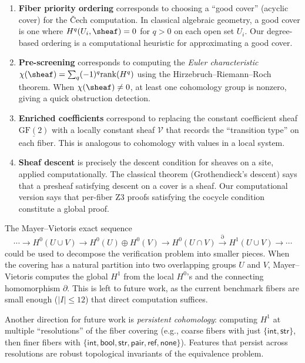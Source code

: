 \begin{enumerate}
  \item \textbf{Fiber priority ordering} corresponds to choosing a
    ``good cover'' (acyclic cover) for the \v{C}ech computation.
    In classical algebraic geometry, a good cover is one where
    $H^q(U_i, \sheaf) = 0$ for $q > 0$ on each open set $U_i$.
    Our degree-based ordering is a computational heuristic for
    approximating a good cover.

  \item \textbf{Pre-screening} corresponds to computing the
    \emph{Euler characteristic} $\chi(\sheaf) = \sum_q (-1)^q
    \mathrm{rank}(H^q)$ using the Hirzebruch--Riemann--Roch theorem.
    When $\chi(\sheaf) \neq 0$, at least one cohomology group is
    nonzero, giving a quick obstruction detection.

  \item \textbf{Enriched coefficients} correspond to replacing the
    constant coefficient sheaf $\underline{\mathrm{GF}(2)}$ with a
    locally constant sheaf $\mathcal{V}$ that records the
    ``transition type'' on each fiber.  This is analogous to
    cohomology with values in a local system.

  \item \textbf{Sheaf descent} is precisely the descent condition
    for sheaves on a site, applied computationally.  The classical
    theorem (Grothendieck's descent) says that a presheaf satisfying
    descent on a cover is a sheaf.  Our computational version says
    that per-fiber Z3 proofs satisfying the cocycle condition
    constitute a global proof.
\end{enumerate}

\begin{remark}
The Mayer--Vietoris exact sequence
\[
  \cdots \to H^0(U \cup V) \to H^0(U) \oplus H^0(V) \to
  H^0(U \cap V) \xrightarrow{\partial} H^1(U \cup V) \to \cdots
\]
could be used to decompose the verification problem into
smaller pieces.  When the covering has a natural partition into
two overlapping groups $U$ and $V$, Mayer--Vietoris computes the
global $H^1$ from the local $H^0$'s and the connecting homomorphism
$\partial$.  This is left to future work, as the current benchmark
fibers are small enough ($|I| \leq 12$) that direct computation
suffices.
\end{remark}

\begin{remark}
Another direction for future work is \emph{persistent cohomology}:
computing $H^1$ at multiple ``resolutions'' of the fiber covering
(e.g., coarse fibers with just $\{\mathsf{int}, \mathsf{str}\}$,
then finer fibers with $\{\mathsf{int}, \mathsf{bool}, \mathsf{str},
\mathsf{pair}, \mathsf{ref}, \mathsf{none}\}$).  Features that
persist across resolutions are robust topological invariants of the
equivalence problem.
\end{remark}
